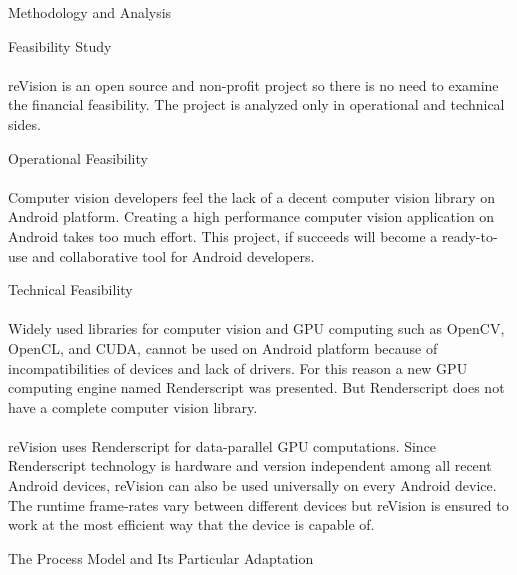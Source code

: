 \documentclass[12pt, a4paper]{article} \pagenumbering{gobble}
\begin{document}
\newpage

\begin{section}{Methodology and Analysis}
  \begin{subsection}{Feasibility Study}
    \paragraph{}{reVision is an open source and non-profit project so there is no need to examine the financial feasibility. The project is analyzed only in operational and technical sides.}
    \begin{subsubsection}{Operational Feasibility}
      \paragraph{}{Computer vision developers feel the lack of a decent computer vision library on Android platform. Creating a high performance computer vision application on Android takes too much effort. This project, if succeeds will become a ready-to-use and collaborative tool for Android developers.}
    \end{subsubsection}

    \begin{subsubsection}{Technical Feasibility}
      \paragraph{}{Widely used libraries for computer vision and GPU computing such as OpenCV, OpenCL, and CUDA, cannot be used on Android platform because of incompatibilities of devices and lack of drivers. For this reason a new GPU computing engine named Renderscript was presented. But Renderscript does not have a complete computer vision library.}
      \paragraph{}{reVision uses Renderscript for data-parallel GPU computations. Since Renderscript technology is hardware and version independent among all recent Android devices, reVision can also be used universally on every Android device. The runtime frame-rates vary between different devices but reVision is ensured to work at the most efficient way that the device is capable of.}
    \end{subsubsection}
  \end{subsection}
  \newpage
  \begin{subsection}{The Process Model and Its Particular Adaptation}

\end{subsection}
\end{section}
\end{document}
